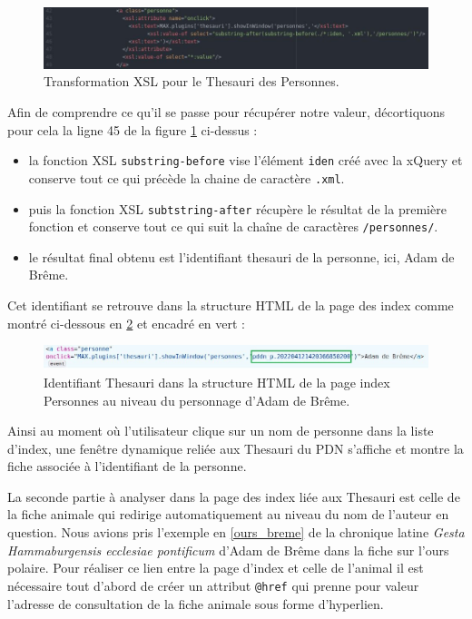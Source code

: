 \documentclass[a4paper,12pt,twoside]{book}
\begin{document}
\begin{figure}[H]
    \centering
    \includegraphics[width=\linewidth]{img/partie_3/xsl_pers.JPG}
    \caption{Transformation \acrshort{XSL} pour le Thesauri des Personnes.}
    \label{xsl_pers}
\end{figure}


Afin de comprendre ce qu'il se passe pour récupérer notre valeur, décortiquons pour cela la ligne 45 de la figure \ref{xsl_pers} ci-dessus :
\begin{itemize}
    \item la fonction \acrshort{XSL} \texttt{substring-before} vise l'élément \texttt{iden} créé avec la xQuery et conserve tout ce qui précède la chaine de caractère \texttt{.xml}.
    \item puis la fonction \acrshort{XSL} \texttt{subtstring-after} récupère le résultat de la première fonction et conserve tout ce qui suit la chaîne de caractères  \texttt{/personnes/}.
    \item le résultat final obtenu est l'identifiant thesauri de la personne, ici, Adam de Brême.
\end{itemize}


Cet identifiant se retrouve dans la structure \acrshort{HTML} de la page des index comme montré ci-dessous en \ref{html_adam} et encadré en vert :

\begin{figure}[H]
    \centering
    \includegraphics[width=\linewidth]{img/partie_3/html_adam.JPG}
    \caption{Identifiant Thesauri dans la structure \acrshort{HTML} de la page index Personnes au niveau du personnage d'Adam de Brême.}
    \label{html_adam}
\end{figure}

Ainsi au moment où l'utilisateur clique sur un nom de personne dans la liste d'index, une fenêtre dynamique reliée aux Thesauri du \acrshort{PDN} s'affiche et montre la fiche associée à l'identifiant de la personne.

La seconde partie à analyser dans la page des index liée aux Thesauri est celle de la fiche animale qui redirige automatiquement au niveau du nom de l'auteur en question. Nous avions pris l'exemple en \ref{ours_breme} de la chronique latine \textit{Gesta Hammaburgensis ecclesiae pontificum} d'Adam de Brême dans la fiche sur l'ours polaire. Pour réaliser ce lien entre la page d'index et celle de l'animal il est nécessaire tout d'abord de créer un attribut \texttt{@href} qui prenne pour valeur l'adresse de consultation de la fiche animale sous forme d'hyperlien.
\end{document}
